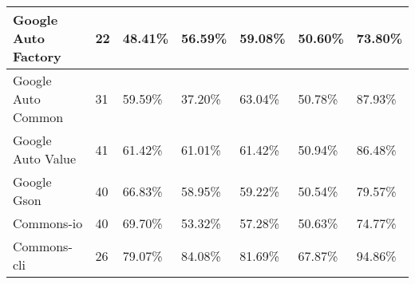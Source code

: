 \documentclass[../../main]{subfiles}
\begin{document}
\begin{table}[!htb]
\begin{tabular}{|l|l|l|l|l|l|l|}
Google Auto   Factory & 22                   & 48.41\%                           & 56.59\%                                                & 59.08\%                            & 50.60\%                                                                                                                                    & 73.80\%                                                                                                                                    \\ \hline
Google Auto   Common  & 31                   & 59.59\%                           & 37.20\%                                                & 63.04\%                            & 50.78\%                                                                                                                                    & 87.93\%                                                                                                                                    \\ \hline
Google Auto   Value   & 41                   & 61.42\%                           & 61.01\%                                                & 61.42\%                            & 50.94\%                                                                                                                                    & 86.48\%                                                                                                                                    \\ \hline
Google Gson           & 40                   & 66.83\%                           & 58.95\%                                                & 59.22\%                            & 50.54\%                                                                                                                                    & 79.57\%                                                                                                                                    \\ \hline
Commons-io            & 40                   & 69.70\%                           & 53.32\%                                                & 57.28\%                            & 50.63\%                                                                                                                                    & 74.77\%                                                                                                                                    \\ \hline
Commons-cli           & 26                   & 79.07\%                           & 84.08\%                                                & 81.69\%                            & 67.87\%                                                                                                                                    & 94.86\%                                                                                                                                    \\ \hline

\end{tabular}
\end{table}
\end{document}
